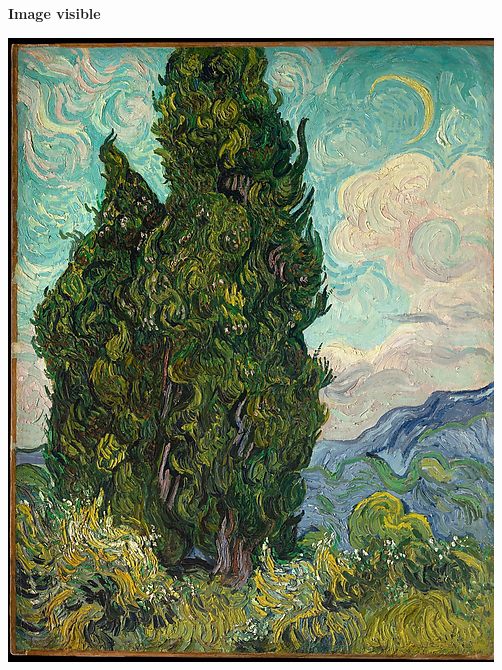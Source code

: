 \documentclass[a4paper, french, 12pt]{article}  %
\begin{document}
\begin{minipage}{0.3\linewidth}
\begin{center}
\textbf{Image visible}

\includegraphics[scale=0.4]{images/cypres.png}
\end{center}
\end{minipage}\hfill
\end{document}
